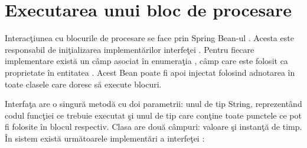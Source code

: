 \section{Executarea unui bloc de procesare}
Interacţiunea cu blocurile de procesare se face prin Spring Bean-ul . Acesta este responsabil de iniţializarea implementărilor interfeţei . Pentru fiecare implementare există un câmp asociat în enumeraţia , câmp care este folosit ca proprietate în entitatea . Acest Bean poate fi apoi injectat folosind adnotarea  în toate clasele care doresc să execute blocuri.

Interfaţa  are o singură metodă  cu doi parametrii: unul de tip String, reprezentând codul funcţiei ce trebuie executat şi unul de tip  care conţine toate punctele ce pot fi folosite în blocul respectiv. Clasa  are două câmpuri: valoare şi instanţă de timp. În sistem există următoarele implementări a interfeţei :

